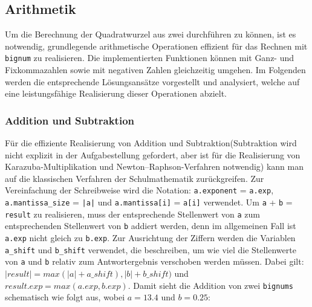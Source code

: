 \documentclass[course=erap]{aspdoc}
\begin{document}
\subsection{Arithmetik}
Um die Berechnung der Quadratwurzel aus zwei durchführen zu können, ist es notwendig, grundlegende arithmetische Operationen effizient für das Rechnen mit \texttt{bignum} zu realisieren. Die implementierten Funktionen können  mit Ganz- und Fixkommazahlen sowie mit negativen Zahlen gleichzeitig umgehen. Im Folgenden werden die entsprechende Lösungsansätze vorgestellt und analysiert, welche auf eine leistungsfähige Realisierung dieser Operationen abzielt.
\subsubsection{Addition und Subtraktion}
Für die effiziente Realisierung von Addition und Subtraktion(Subtraktion wird nicht explizit in der Aufgabestellung gefordert, aber ist für die Realisierung von Karazuba-Multiplikation und Newton–Raphson-Verfahren notwendig) kann man auf die klassischen Verfahren der Schulmathematik zurückgreifen. Zur Vereinfachung der Schreibweise wird die Notation: \texttt{a.exponent} = \texttt{a.exp}, \texttt{a.mantissa\_size} = \texttt{|a|} und \texttt{a.mantissa[i]} = \texttt{a[i]} verwendet. Um \texttt{a} + \texttt{b} = \texttt{result} zu realisieren, muss der entsprechende Stellenwert von \texttt{a} zum entsprechenden Stellenwert von \texttt{b} addiert werden, denn im allgemeinen Fall ist \texttt{a.exp} nicht gleich zu \texttt{b.exp}. 
Zur Ausrichtung der Ziffern werden die Variablen \texttt{a\_shift} und \texttt{b\_shift} verwendet, die beschreiben, um wie viel die Stellenwerte von \texttt{a} und \texttt{b} relativ zum Antwortergebnis verschoben werden müssen. Dabei gilt: $|result| = max(|a| + a\_shift), |b| + b\_shift)$ und $result.exp = max(a.exp, b.exp)$. Damit sieht die Addition von zwei \texttt{bignums} schematisch wie folgt aus, wobei $a = 13.4$ und $b = 0.25$:
\end{document}
